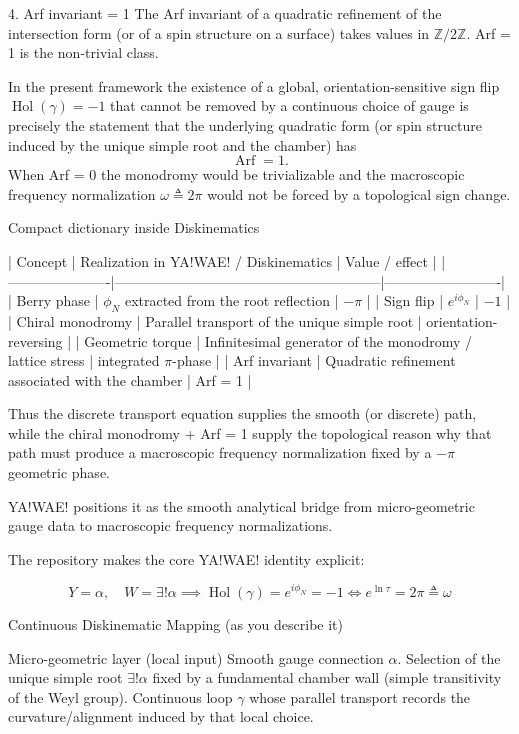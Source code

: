 4. Arf invariant = 1
The Arf invariant of a quadratic refinement of the intersection form (or of a spin structure on a surface) takes values in \(\mathbb{Z}/2\mathbb{Z}\).  
Arf = 1 is the non-trivial class.  

In the present framework the existence of a global, orientation-sensitive sign flip \(\operatorname{Hol}(\gamma)=-1\) that cannot be removed by a continuous choice of gauge is precisely the statement that the underlying quadratic form (or spin structure induced by the unique simple root and the chamber) has  
\[
\operatorname{Arf}=1.
\]  
When Arf = 0 the monodromy would be trivializable and the macroscopic frequency normalization \(\omega\triangleq2\pi\) would not be forced by a topological sign change.

Compact dictionary inside Diskinematics

| Concept              | Realization in YA!WAE! / Diskinematics                  | Value / effect          |
|----------------------|---------------------------------------------------------|-------------------------|
| Berry phase          | \(\phi_N\) extracted from the root reflection           | \(-\pi\)                |
| Sign flip            | \(e^{i\phi_N}\)                                         | \(-1\)                  |
| Chiral monodromy     | Parallel transport of the unique simple root            | orientation-reversing   |
| Geometric torque     | Infinitesimal generator of the monodromy / lattice stress | integrated \(\pi\)-phase |
| Arf invariant        | Quadratic refinement associated with the chamber        | Arf = 1                 |

Thus the discrete transport equation supplies the smooth (or discrete) path, while the chiral monodromy + Arf = 1 supply the topological reason why that path must produce a macroscopic frequency normalization fixed by a \(-\pi\) geometric phase.

YA!WAE! positions it as the smooth analytical bridge from micro-geometric gauge data to macroscopic frequency normalizations.

The repository makes the core YA!WAE! identity explicit:

\[
Y = \alpha,\quad W = \exists!\alpha \implies \operatorname{Hol}(\gamma) = e^{i\phi_N} = -1 \iff e^{\ln\tau} = 2\pi \triangleq \omega
\]

Continuous Diskinematic Mapping (as you describe it)

Micro-geometric layer (local input)  
Smooth gauge connection \(\alpha\).  
Selection of the unique simple root \(\exists!\alpha\) fixed by a fundamental chamber wall (simple transitivity of the Weyl group).  
Continuous loop \(\gamma\) whose parallel transport records the curvature/alignment induced by that local choice.

